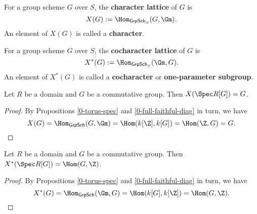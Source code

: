 \begin{definition}
  \label{0-char}
  \leanok

  For a group scheme $G$ over $S$, the {\bf character lattice} of $G$ is
  \[
    X(G) := \Hom_{\mathsf{GrpSch}_S}(G, \Gm).
  \]
  An element of $X(G)$ is called a {\bf character}.
\end{definition}


\begin{definition}
  \label{0-cochar}
  \leanok

  For a group scheme $G$ over $S$, the {\bf cocharacter lattice} of $G$ is
  \[
    X^*(G) := \Hom_{\mathsf{GrpSch}_S}(\Gm, G).
  \]
  An element of $X^*(G)$ is called a {\bf cocharacter} or {\bf one-parameter subgroup}.
\end{definition}


\begin{proposition}
  \label{0-char-diag}
  \leanok

  Let $R$ be a domain and $G$ be a commutative group.
  Then $X(\Spec R[G]) = G$.
\end{proposition}
\begin{proof}

  By Propositions \ref{0-torus-spec} and \ref{0-full-faithful-diag} in turn, we have
  \[
    X(G) = \Hom_{\mathsf{GrpSch}}(G, \Gm) = \Hom(k[\Z], k[G]) = \Hom(\Z, G) = G.
  \]
\end{proof}


\begin{proposition}
  \label{0-cochar-diag}
  \leanok

  Let $R$ be a domain and $G$ be a commutative group.
  Then $X^*(\Spec R[G]) = \Hom(G, \Z)$.
\end{proposition}
\begin{proof}

  By Propositions \ref{0-torus-spec} and \ref{0-full-faithful-diag} in turn, we have
  \[
    X^*(G) = \Hom_{\mathsf{GrpSch}}(\Gm, G) = \Hom(k[G], k[\Z]) = \Hom(G, \Z).
  \]
\end{proof}


